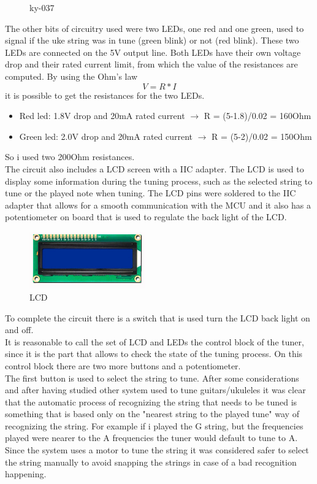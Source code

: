 \documentclass[a4paper,12pt]{article}
\begin{document}
\begin{multicols}{2}
\begin{figure}[H]
\begin{center}
        \caption{ky-037}
        \label{fig:ky-037}
    \end{center}
\end{figure}
The other bits of circuitry used were two LEDs, one red and one green, used to signal if the uke string was in tune (green blink) or not (red blink). These two LEDs are connected on the 5V output line. Both LEDs have their own voltage drop and their rated current limit, from which the value of the resistances are computed. By using the Ohm's law \[V=R*I\] it is possible to get the resistances for the two LEDs.
\begin{itemize}
    \item Red led: 1.8V drop and 20mA rated current $\rightarrow$ R = (5-1.8)/0.02 = 160Ohm
    \item Green led: 2.0V drop and 20mA rated current $\rightarrow$ R = (5-2)/0.02 = 150Ohm
\end{itemize}
So i used two 200Ohm resistances.\\
The circuit also includes a LCD screen with a IIC adapter. The LCD is used to display some information during the tuning process, such as the selected string to tune or the played note when tuning. The LCD pins were soldered to the IIC adapter that allows for a smooth communication with the MCU and it also has a potentiometer on board that is used to regulate the back light of the LCD.
\begin{figure}[H]
    \begin{center}
        \includegraphics[width=5cm]{images/lcd1602.PNG}
        \caption{LCD}
        \label{fig:LCD}
    \end{center}
\end{figure}
To complete the circuit there is a switch that is used turn the LCD back light on and off.\\
It is reasonable to call the set of LCD and LEDs the control block of the tuner, since it is the part that allows to check the state of the tuning process. On this control block there are two more buttons and a potentiometer.\\
The first button is used to select the string to tune. After some considerations and after having studied other system used to tune guitars/ukuleles it was clear that the automatic process of recognizing the string that needs to be tuned is something that is based only on the "nearest string to the played tune" way of recognizing the string. For example if i played the G string, but the frequencies played were nearer to the A frequencies the tuner would default to tune to A. Since the system uses a motor to tune the string it was considered safer to select the string manually to avoid snapping the strings in case of a bad recognition happening.\\

\end{multicols}
\end{document}
